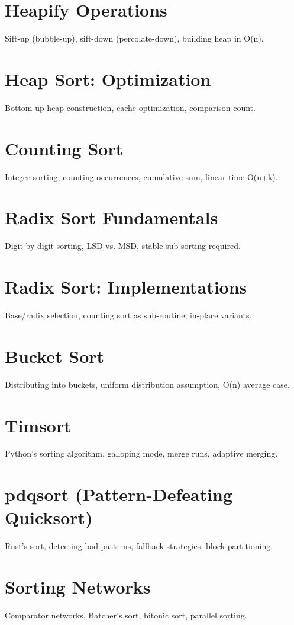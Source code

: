 \chapter{Heapify Operations}
Sift-up (bubble-up), sift-down (percolate-down), building heap in O(n).

\chapter{Heap Sort: Optimization}
Bottom-up heap construction, cache optimization, comparison count.

\chapter{Counting Sort}
Integer sorting, counting occurrences, cumulative sum, linear time O(n+k).

\chapter{Radix Sort Fundamentals}
Digit-by-digit sorting, LSD vs. MSD, stable sub-sorting required.

\chapter{Radix Sort: Implementations}
Base/radix selection, counting sort as sub-routine, in-place variants.

\chapter{Bucket Sort}
Distributing into buckets, uniform distribution assumption, O(n) average case.

\chapter{Timsort}
Python's sorting algorithm, galloping mode, merge runs, adaptive merging.

\chapter{pdqsort (Pattern-Defeating Quicksort)}
Rust's sort, detecting bad patterns, fallback strategies, block partitioning.

\chapter{Sorting Networks}
Comparator networks, Batcher's sort, bitonic sort, parallel sorting.

